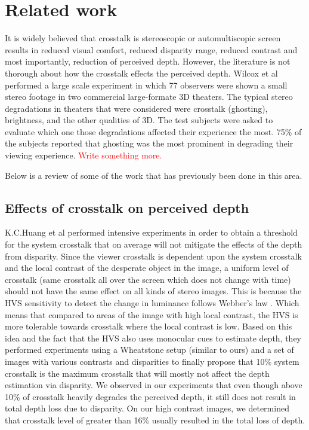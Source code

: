 \chapter{Related work}
\label{chap:relatedWork}
It is widely believed that crosstalk is stereoscopic or automultiscopic screen results in reduced visual comfort, reduced disparity range, reduced contrast and most importantly, reduction of perceived depth. However, the literature is not thorough about how the  crosstalk effects the perceived depth. Wilcox et al \cite{wilcox2003determinants} performed a large scale experiment in which 77 observers were shown a small stereo footage in two commercial large-formate 3D theaters. The typical stereo degradations in theaters that were considered were crosstalk (ghosting), brightness, and the other qualities of 3D. The test subjects were asked to evaluate which one those degradations affected their experience the most. 75\% of the subjects reported that ghosting was the most prominent in degrading their viewing experience.
\textcolor{red}{Write something more.}

Below is a review of some of the work that has previously been done in this area.

\section{Effects of crosstalk on perceived depth}
K.C.Huang et al \cite{huang2003crosstalk} performed intensive experiments in order to obtain a threshold for the system crosstalk that on average will not mitigate the effects of the depth from disparity. Since the viewer crosstalk is dependent upon the system crosstalk and the local contrast of the desperate object in the image, a uniform level of crosstalk (same crosstalk all over the screen which does not change with time) should not have the same effect on all kinds of stereo images. This is because the HVS sensitivity to detect the change in luminance follows Webber's law \cite{webber}. Which means that compared to areas of the image with high local contrast, the HVS is more tolerable towards crosstalk where the local contrast is low. Based on this idea and the fact that the HVS also uses monocular cues to estimate depth, they performed experiments using a Wheatstone setup (similar to ours) and a set of images with various contrasts and disparities to finally propose that 10\% system crosstalk is the maximum crosstalk that will mostly not affect the depth estimation via disparity. We observed in our experiments that even though above 10\% of crosstalk heavily degrades the perceived depth, it still does not result in total depth loss due to disparity. On our high contrast images, we determined that crosstalk level of greater than 16\% usually resulted in the total loss of depth.

